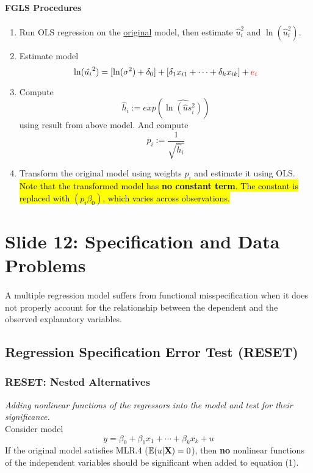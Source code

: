 \documentclass[]{article}
\begin{document}
			\paragraph{FGLS Procedures}
				\begin{enumerate}
					\item Run OLS regression on the \ul{original} model, then estimate $\hat{u}_i^2$ and $\ln(\hat{u}_i^2)$.
					\item Estimate model 
						\[
							\ln(\hat{u_i}^2) = [\ln(\sigma^2) + \delta_0] + [\delta_1 x_{i1} + \dots + \delta_k x_{ik}] + \textcolor{red}{e_i}
						\]
					\item Compute 
						\[
							\hat{h}_i := exp(\widehat{\ln(\hat{u}s_i^2)})
						\]
					using result from above model. And compute 
					\[
						p_i := \frac{1}{\sqrt{\hat{h}_i}}
					\]
					\item Transform the original model using weights $p_i$ and estimate it using OLS. \hl{Note that the transformed model has \textbf{no constant term}. The constant is replaced with $(p_i \beta_0)$, which varies across observations.}
				\end{enumerate}
	\section{Slide 12: Specification and Data Problems}
		\paragraph{} A multiple regression model suffers from functional misspecification when it does not properly account for the relationship between the dependent and the observed explanatory variables.
		\subsection{Regression Specification Error Test (RESET)}
		\subsubsection{RESET: Nested Alternatives}
			\par \emph{Adding nonlinear functions of the regressors into the model and test for their significance.}
			\\
			Consider model 
			\begin{equation}
				y = \beta_0 + \beta_1 x_1 + \cdots + \beta_k x_k + u
			\end{equation}
			If the original model satisfies MLR.4 ($\mathbb{E}({u|\textbf{X}})=0$), then \textbf{no} nonlinear functions of the independent variables should be significant when added to equation (1). 
			
\end{document}
